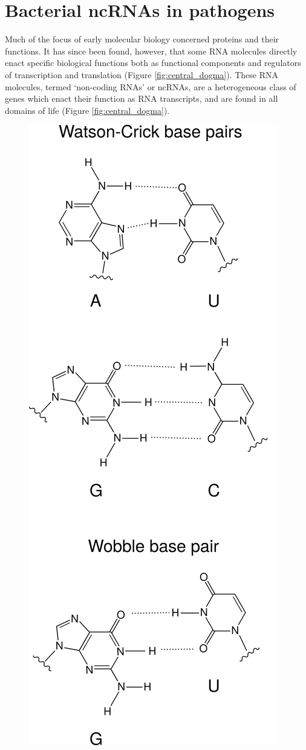 \section{Bacterial ncRNAs in pathogens}
Much of the focus of early molecular biology concerned proteins and their functions. It has since been found, however, that some RNA molecules directly enact specific biological functions both as functional components and regulators of transcription and translation \citep{Eddy2001-jv,Morris2014-mm} (Figure \ref{fig:central_dogma}). These RNA molecules, termed ‘non-coding RNAs’ or ncRNAs, are a heterogeneous class of genes which enact their function as RNA transcripts, and are found in all domains of life (Figure \ref{fig:central_dogma}).
\begin{figure}[H]
    \centering
    \begin{minipage}[b]{0.47\linewidth}
  \includegraphics[scale=0.45]{intro/basepairing.png}

\end{minipage}
\end{figure}
